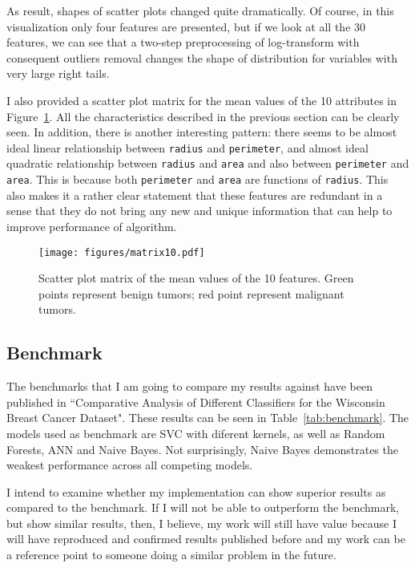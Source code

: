 \documentclass[10pt, a4paper]{article}
\begin{document}
As result, shapes of scatter plots changed quite dramatically. Of course, in this visualization only four features are presented, but if we look at all the 30 features, we can see that a two-step preprocessing of log-transform with consequent outliers removal changes the shape of distribution for variables with very large right tails.



I also provided a scatter plot matrix for the mean values of the 10 attributes in Figure~\ref{fig:scatter-matrix}. All the characteristics described in the previous section can be clearly seen. In addition, there is another interesting pattern: there seems to be almost ideal linear relationship between \texttt{radius} and \texttt{perimeter}, and almost ideal quadratic relationship between \texttt{radius} and \texttt{area} and also between \texttt{perimeter} and \texttt{area}. This is because both \texttt{perimeter} and \texttt{area} are functions of \texttt{radius}. This also makes it a rather clear statement that these features are redundant in a sense that they do not bring any new and unique information that can help to improve performance of algorithm.

\begin{figure}[h!]
	\centering
	\texttt{[image: figures/matrix10.pdf]}\\
	\caption{Scatter plot matrix of the mean values of the 10 features. Green points represent benign tumors; red point represent malignant tumors.}
	\label{fig:scatter-matrix}
\end{figure}

\subsection{Benchmark}



The benchmarks that I am going to compare my results against have been published in ``Comparative Analysis of Different Classifiers for the Wisconsin Breast Cancer Dataset"\cite{benchmarks-paper}. These results can be seen in Table~\ref{tab:benchmark}. The models used as benchmark are SVC with diferent kernels, as well as Random Forests, ANN and Naive Bayes. Not surprisingly, Naive Bayes demonstrates the weakest performance across all competing models.

I intend to examine whether my implementation can show superior results as compared to the benchmark. If I will not be able to outperform the benchmark, but show similar results, then, I believe, my work will still have value because I will have reproduced and confirmed results published before and my work can be a reference point to someone doing a similar problem in the future.
\end{document}
